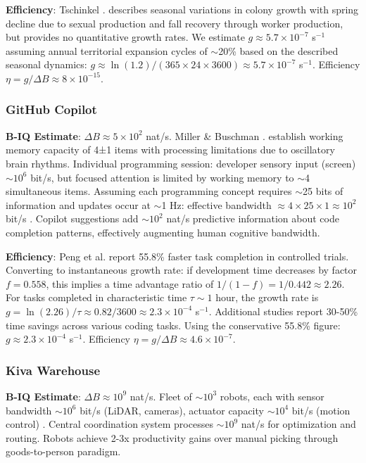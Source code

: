 \documentclass[10pt,conference]{IEEEtran}
\begin{document}
\textbf{Efficiency}: Tschinkel \cite{tschinkel2011}. describes seasonal variations in colony growth with spring decline due to sexual production and fall recovery through worker production, but provides no quantitative growth rates. We estimate $g \approx 5.7 \times 10^{-7}$ s$^{-1}$ assuming annual territorial expansion cycles of $\sim$20\% based on the described seasonal dynamics: $g \approx \ln(1.2)/(365 \times 24 \times 3600) \approx 5.7 \times 10^{-7}$ s$^{-1}$. Efficiency $\eta = g/\Delta B \approx 8 \times 10^{-15}$.

\subsubsection{GitHub Copilot}
\textbf{B-IQ Estimate}: $\Delta B \approx 5 \times 10^2$ nat/s. Miller \& Buschman \cite{miller2015}. establish working memory capacity of 4±1 items with processing limitations due to oscillatory brain rhythms. Individual programming session: developer sensory input (screen) $\sim 10^6$ bit/s, but focused attention is limited by working memory to $\sim$4 simultaneous items. Assuming each programming concept requires $\sim$25 bits of information and updates occur at $\sim$1 Hz: effective bandwidth $\approx 4 \times 25 \times 1 \approx 10^2$ bit/s \cite{miller2015}. Copilot suggestions add $\sim 10^2$ nat/s predictive information about code completion patterns, effectively augmenting human cognitive bandwidth.

\textbf{Efficiency}: Peng et al. \cite{peng2023} report 55.8\% faster task completion in controlled trials. Converting to instantaneous growth rate: if development time decreases by factor $f = 0.558$, this implies a time advantage ratio of $1/(1-f) = 1/0.442 \approx 2.26$. For tasks completed in characteristic time $\tau \sim 1$ hour, the growth rate is $g = \ln(2.26)/\tau \approx 0.82/3600 \approx 2.3 \times 10^{-4}$ s$^{-1}$. Additional studies \cite{github2023, ziegler2024, pandey2024} report 30-50\% time savings across various coding tasks. Using the conservative 55.8\% figure: $g \approx 2.3 \times 10^{-4}$ s$^{-1}$. Efficiency $\eta = g/\Delta B \approx 4.6 \times 10^{-7}$.

\subsubsection{Kiva Warehouse}
\textbf{B-IQ Estimate}: $\Delta B \approx 10^9$ nat/s. Fleet of $\sim 10^3$ robots, each with sensor bandwidth $\sim 10^6$ bit/s (LiDAR, cameras), actuator capacity $\sim 10^4$ bit/s (motion control) \cite{wulfraat2012}. Central coordination system processes $\sim 10^9$ nat/s for optimization and routing. Robots achieve 2-3x productivity gains over manual picking through goods-to-person paradigm.
\end{document}
